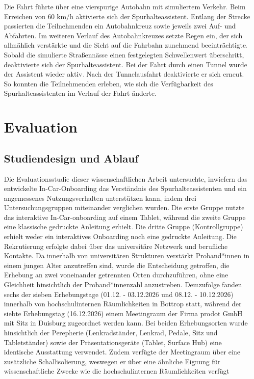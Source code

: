 Die Fahrt führte über eine vierspurige Autobahn mit simuliertem Verkehr. Beim Erreichen von 60 km/h aktivierte sich der Spurhalteassistent. Entlang der Strecke passierten die Teilnehmenden ein Autobahnkreuz sowie jeweils zwei Auf- und Abfahrten. Im weiteren Verlauf des Autobahnkreuzes setzte Regen ein, der sich allmählich verstärkte und die Sicht auf die Fahrbahn zunehmend beeinträchtigte. Sobald die simulierte Straßennässe einen festgelegten Schwellenwert überschritt, deaktivierte sich der Spurhalteassistent. Bei der Fahrt durch einen Tunnel wurde der Assistent wieder aktiv. Nach der Tunnelausfahrt deaktivierte er sich erneut. So konnten die Teilnehmenden erleben, wie sich die Verfügbarkeit des Spurhalteassistenten im Verlauf der Fahrt änderte.

\section{Evaluation}
\label{sec:Methodik_Phase_fünf}

\subsection{Studiendesign und Ablauf}
\label{subsec:studiendesign_und_ablauf}

Die Evaluationsstudie dieser wissenschaftlichen Arbeit untersuchte, inwiefern das entwickelte In-Car-Onboarding das Verständnis des Spurhalteassistenten und ein angemessenes Nutzungsverhalten unterstützen kann, indem drei Untersuchungsgruppen miteinander verglichen wurden. Die erste Gruppe nutzte das interaktive In-Car-onboarding auf einem Tablet, während die zweite Gruppe eine klassische gedruckte Anleitung erhielt. Die dritte Gruppe (Kontrollgruppe) erhielt weder ein interaktives Onboarding noch eine gedruckte Anleitung. Die Rekrutierung erfolgte dabei über das universitäre Netzwerk und berufliche Kontakte. Da innerhalb von universitären Strukturen verstärkt Proband*innen in einem jungen Alter anzutreffen sind, wurde die Entscheidung getroffen, die Erhebung an zwei voneinander getrennten Orten durchzuführen, ohne eine Gleichheit hinsichtlich der Proband*innenzahl anzustreben. Demzufolge fanden sechs der sieben Erhebungstage (01.12. - 03.12.2026 und 08.12. - 10.12.2026) innerhalb von hochschulinternen Räumlichkeiten in Bottrop statt, während der siebte Erhebungstag (16.12.2026) einem Meetingraum der Firma prodot GmbH mit Sitz in Duisburg zugeordnet werden kann. Bei beiden Erhebungsorten wurde hinsichtlich der Perepherie (Lenkradständer, Lenkrad, Pedale, Sitz und Tabletständer) sowie der Präsentationsgeräte (Tablet, Surface Hub) eine identische Ausstattung verwendet. Zudem verfügte der Meetingraum über eine zusätzliche Schallisolierung, weswegen er über eine ähnliche Eignung für wissenschaftliche Zwecke wie die hochschulinternen Räumlichkeiten verfügt

